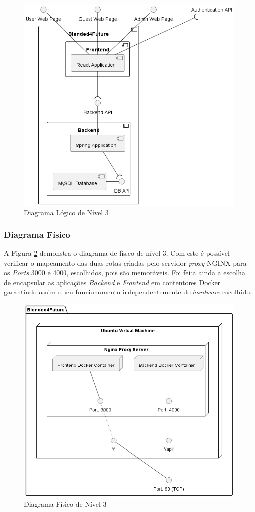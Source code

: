 \begin{figure}[h!tbp]
    \centering
    \includegraphics[width=0.8\linewidth]{capitulos/cap3-analisedoproblema/assets/arquiteturasistema/logical/logical_l3.png}
    \caption{Diagrama Lógico de Nível 3}
    \label{fig:diagram-lvl3-logical}
\end{figure}

\subsubsection{Diagrama Físico} 
A Figura \ref{fig:diagram-lvl3-physical} demonstra o diagrama de físico de nível 3. Com este é possível verificar o mapeamento das duas rotas criadas pelo servidor \textit{proxy} \gls{NGINX} para os \textit{Ports} 3000 e 4000, escolhidos, pois são memoráveis. Foi feita ainda a escolha de encapsular as aplicações \textit{Backend} e \textit{Frontend} em contentores \gls{Docker} garantindo assim o seu funcionamento independentemente do \textit{hardware} escolhido.

\begin{figure}[h!tbp]
    \centering
    \includegraphics[width=0.7\linewidth]{capitulos/cap3-analisedoproblema/assets/arquiteturasistema/physical/physical_l3.png}
    \caption{Diagrama Físico de Nível 3}
    \label{fig:diagram-lvl3-physical}
\end{figure}





